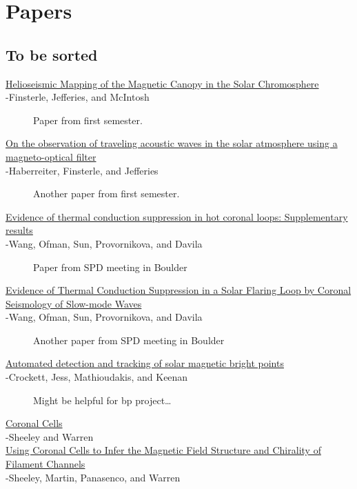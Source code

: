 \documentclass{article}
\begin{document}
\section{Papers}
\subsection{To be sorted}
\begin{description}
    \item [\href{http://adsabs.harvard.edu/abs/2004ApJ...613L.185F}
        {Helioseismic Mapping of the Magnetic Canopy in the Solar Chromosphere}\\
        -Finsterle, Jefferies, and McIntosh]
        Paper from first semester.
    \item [\href{http://cdsads.u-strasbg.fr/abs/2007AN....328..211H}
        {On the observation of traveling acoustic waves in the solar
            atmosphere using a magneto-optical filter}\\
        -Haberreiter, Finsterle, and Jefferies]
        Another paper from first semester.
    \item [\href{http://cdsads.u-strasbg.fr/abs/2015arXiv151002750W}
        {Evidence of thermal conduction suppression in hot coronal loops:
            Supplementary results}\\
        -Wang, Ofman, Sun, Provornikova, and Davila]
        Paper from SPD meeting in Boulder
	\item [\href{http://cdsads.u-strasbg.fr/abs/2015ApJ...811L..13W`}
        {Evidence of Thermal Conduction Suppression in a Solar Flaring
            Loop by Coronal Seismology of Slow-mode Waves}\\
        -Wang, Ofman, Sun, Provornikova, and Davila]
        Another paper from SPD meeting in Boulder
	\item [\href{http://cdsads.u-strasbg.fr/abs/2009MNRAS.397.1852C}
        {Automated detection and tracking of solar magnetic bright points}\\
        -Crockett, Jess, Mathioudakis, and Keenan]
        Might be helpful for bp project\ldots
	\item [\href{http://cdsads.u-strasbg.fr/abs/2012ApJ...749...40S}
        {Coronal Cells}\\
        -Sheeley and Warren]
	\item [\href{http://cdsads.u-strasbg.fr/abs/2013ApJ...772...88S}
        {Using Coronal Cells to Infer the Magnetic Field Structure and
            Chirality of Filament Channels}\\
        -Sheeley, Martin, Panasenco, and Warren]
\end{description}
\end{document}
